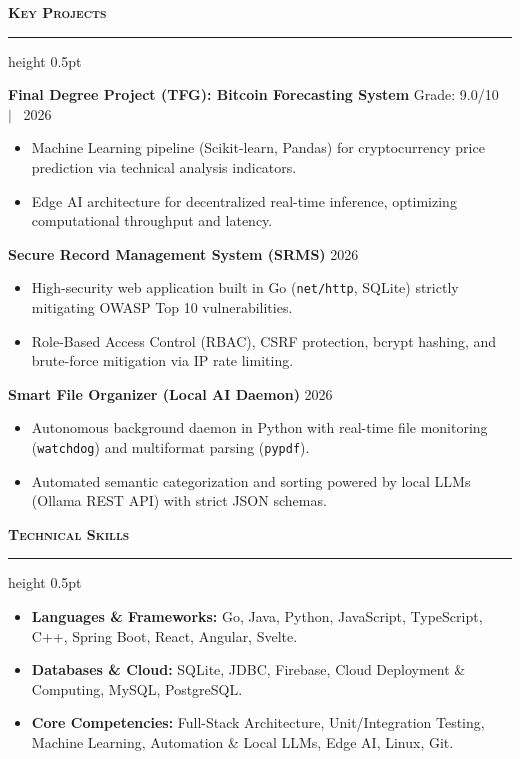 \documentclass[10pt,a4paper]{article}
\newcommand{\cvsection}[1]{%
  \vspace{0.45em}%
  {\large\textbf{\textsc{#1}}}\\[-0.5em]%
  {\color{primary}\hrule height 0.5pt}%
  \vspace{0.35em}%
}
\begin{document}
\cvsection{Key Projects}
\textbf{Final Degree Project (TFG): Bitcoin Forecasting System} \hfill Grade: 9.0/10 \ $\vert$ \ 2026
\begin{itemize}[leftmargin=1.2em, itemsep=1.2pt, topsep=1.5pt]
  \item Machine Learning pipeline (Scikit-learn, Pandas) for cryptocurrency price prediction via technical analysis indicators.
  \item Edge AI architecture for decentralized real-time inference, optimizing computational throughput and latency.
\end{itemize}

\vspace{0.15em}
\textbf{Secure Record Management System (SRMS)} \hfill 2026
\begin{itemize}[leftmargin=1.2em, itemsep=1.2pt, topsep=1.5pt]
  \item High-security web application built in Go (\texttt{net/http}, SQLite) strictly mitigating OWASP Top 10 vulnerabilities.
  \item Role-Based Access Control (RBAC), CSRF protection, bcrypt hashing, and brute-force mitigation via IP rate limiting.
\end{itemize}

\vspace{0.15em}
\textbf{Smart File Organizer (Local AI Daemon)} \hfill 2026
\begin{itemize}[leftmargin=1.2em, itemsep=1.2pt, topsep=1.5pt]
  \item Autonomous background daemon in Python with real-time file monitoring (\texttt{watchdog}) and multiformat parsing (\texttt{pypdf}).
  \item Automated semantic categorization and sorting powered by local LLMs (Ollama REST API) with strict JSON schemas.
\end{itemize}

\cvsection{Technical Skills}
\begin{itemize}[leftmargin=1.2em, itemsep=1.2pt, topsep=1.5pt]
  \item \textbf{Languages \& Frameworks:} Go, Java, Python, JavaScript, TypeScript, C++, Spring Boot, React, Angular, Svelte.
  \item \textbf{Databases \& Cloud:} SQLite, JDBC, Firebase, Cloud Deployment \& Computing, MySQL, PostgreSQL.
  \item \textbf{Core Competencies:} Full-Stack Architecture, Unit/Integration Testing, Machine Learning, Automation \& Local LLMs, Edge AI, Linux, Git.
\end{itemize}
\end{document}
